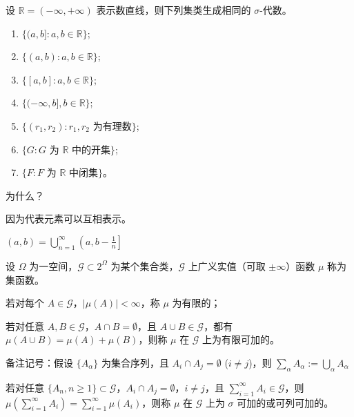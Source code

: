 \documentclass[lang=cn,10pt,thmcnt=section]{elegantbook}
\begin{document}
\begin{theorem}
	设 \(\mathbb{R} = (-\infty, +\infty)\) 表示数直线，则下列集类生成相同的 \(\sigma\)-代数。
\begin{enumerate}
    \item \(\{(a, b] : a, b \in \mathbb{R}\}\);
    \item \(\{(a, b) : a, b \in \mathbb{R}\}\);
    \item \(\{[a, b] : a, b \in \mathbb{R}\}\);
    \item \(\{(-\infty, b], b \in \mathbb{R}\}\);
    \item \(\{(r_1, r_2) : r_1, r_2 \text{ 为有理数}\}\);
    \item \(\{G : G \text{ 为 } \mathbb{R} \text{ 中的开集}\}\);
    \item \(\{F : F \text{ 为 } \mathbb{R} \text{ 中闭集}\}\)。
\end{enumerate}
\end{theorem}

为什么？

因为代表元素可以互相表示。

\((a, b) = \bigcup_{n=1}^{\infty} \left(a, b - \frac{1}{n}\right]\)

\begin{definition}
	设 \(\Omega\) 为一空间，\(\mathscr{G} \subset 2^\Omega\) 为某个集合类，\(\mathscr{G}\) 上广义实值（可取 \(\pm \infty\)）函数 \(\mu\) 称为集函数。
\end{definition}

若对每个 \(A \in \mathscr{G}\)，\(|\mu(A)| < \infty\)，称 \(\mu\) 为有限的；

若对任意 \(A, B \in \mathscr{G}\)，\(A \cap B = \emptyset\)，且 \(A \cup B \in \mathscr{G}\)，都有 \(\mu(A \cup B) = \mu(A) + \mu(B)\)，则称 \(\mu\) 在 \(\mathscr{G}\) 上为有限可加的。

备注记号：假设 \(\{A_\alpha\}\) 为集合序列，且 \(A_i \cap A_j = \emptyset\) (\(i \neq j\))，则 \(\sum_\alpha A_\alpha := \bigcup_\alpha A_\alpha\)

若对任意 \(\{A_n, n \geq 1\} \subset \mathscr{G}\)，\(A_i \cap A_j = \emptyset\)，\(i \neq j\)，且 \(\sum_{i=1}^{\infty} A_i \in \mathscr{G}\)，则 \(\mu\left(\sum_{i=1}^{\infty} A_i\right) = \sum_{i=1}^{\infty} \mu(A_i)\)，则称 \(\mu\) 在 \(\mathscr{G}\) 上为 \(\sigma\) 可加的或可列可加的。
\end{document}
